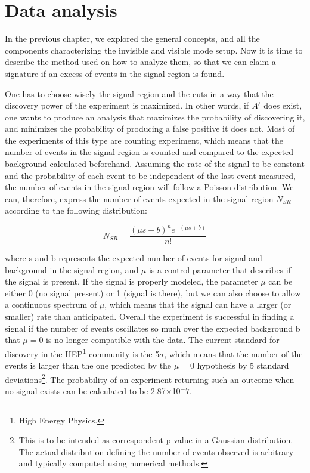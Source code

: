 
\newcommand{\pdirthree}{chapters/plots/chapter3}

\chapter{Data analysis} %
\label{chapter3} %


In the previous chapter, we explored the general concepts, and all the components characterizing the invisible and visible mode setup. Now it is time to describe the method used on how to analyze them, so that we can claim a signature if an excess of events in the signal region is found.

One has to choose wisely the signal region and the cuts in a way that the discovery power of the experiment is maximized. In other words, if $A'$ does exist, one wants to produce an analysis that maximizes the probability of discovering it, and minimizes the probability of producing a false positive it does not.  Most of the experiments of this type are counting experiment, which means that the number of events in the signal region is counted and compared to the expected background calculated beforehand. Assuming the rate of the signal to be constant and the probability of each event to be independent of the last event measured, the number of events in the signal region will follow a Poisson distribution. We can, therefore, express the number of events expected in the signal region $N_{SR}$ according to the following distribution:


\begin{equation}
  \label{eq:poisson-simple}
  N_{SR} = \frac{(\mu s + b)^ne^{-(\mu s + b)}}{n!}
\end{equation}

where s and b represents the expected number of events for signal and background in the signal region, and $\mu$ is a control parameter that describes if the signal is present. If the signal is properly modeled, the parameter $\mu$ can be either 0 (no signal present) or 1 (signal is there), but we can also choose to allow a continuous spectrum of $\mu$, which means that the signal can have a larger (or smaller) rate than anticipated. Overall the experiment is successful in finding a signal if the number of events oscillates so much over the expected background b that $\mu = 0$ is no longer compatible with the data. The current standard for discovery in the HEP\footnote{High Energy Physics.} community is the 5$\sigma$, which means that the number of the events is larger than the one predicted by the $\mu = 0$ hypothesis by 5 standard deviations\footnote{This is to be intended as correspondent p-value in a Gaussian distribution. The actual distribution defining the number of events observed is arbitrary and typically computed using numerical methods.}. The probability of an experiment returning such an outcome when no signal exists can be calculated to be 2.87$\times$10$^-7$.

